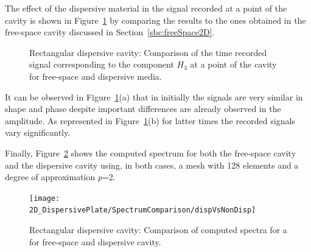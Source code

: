 The effect of the dispersive material in the signal recorded at a point of the cavity is shown in Figure~\ref{fig:freeSpaceDispersiveSignal} by comparing the results to the ones obtained in the free-space cavity discussed in Section~\ref{sbc:freeSpace2D}.
\begin{figure}[!ht]
	\centering
	\caption{Rectangular dispersive cavity: Comparison of the time recorded signal corresponding to the component $H_3$ at a point of the cavity for free-space and dispersive media.}
	\label{fig:freeSpaceDispersiveSignal}
\end{figure}
It can be observed in Figure~\ref{fig:freeSpaceDispersiveSignal}(a) that in initially the signals are very similar in shape and phase despite important differences are already observed in the amplitude. As represented in Figure~\ref{fig:freeSpaceDispersiveSignal}(b) for latter times the recorded signals vary significantly.

Finally, Figure~\ref{fig:dispersiveFreeSpaceSpectrum} shows the computed spectrum for both the free-space cavity and the dispersive cavity using, in both cases, a mesh with 128 elements and a degree of approximation $p$=2. 
\begin{figure}[!ht]
\centering
\texttt{[image: 2D\_DispersivePlate/SpectrumComparison/dispVsNonDisp]}
\caption{Rectangular dispersive cavity: Comparison of computed spectra for a for free-space and dispersive cavity.}
\label{fig:dispersiveFreeSpaceSpectrum}
\end{figure}

